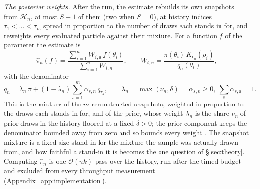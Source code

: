 \documentclass[10pt]{article}
\theoremstyle{plain}
\theoremstyle{definition}
\begin{document}
\emph{The posterior weights.} After the run, the estimate rebuilds its own snapshots from $\mathcal{H}_n$, at most $S{+}1$ of them (two when $S=0$), at history indices $\tau_1<\dots<\tau_m$ spread in proportion to the number of draws each stands in for, and reweights every evaluated particle against their mixture. For a function $f$ of the parameter the estimate is
\begin{equation}
\widehat\pi_n(f) = \frac{\sum_{i=1}^n W_{i,n}\,f(\theta_i)}{\sum_{i=1}^n W_{i,n}},
\qquad
W_{i,n} = \frac{\pi(\theta_i)\,K_{\epsilon_n}(\rho_i)}{\bar q_n(\theta_i)},
\label{eq:posterior-estimator}
\end{equation}
with the denominator
\begin{equation}
\bar q_n = \lambda_n\,\pi + (1-\lambda_n)\sum_{s=1}^{m}\alpha_{s,n}\,q_{\tau_s},
\qquad \lambda_n=\max(\nu_n,\delta),\quad \alpha_{s,n}\ge0,\ \textstyle\sum_s\alpha_{s,n}=1.
\label{eq:snapshot-denominator}
\end{equation}
This is the mixture of the $m$ reconstructed snapshots, weighted in proportion to the draws each stands in for, and of the prior, whose weight $\lambda_n$ is the share $\nu_n$ of prior draws in the history floored at a fixed $\delta>0$; the prior component keeps the denominator bounded away from zero and so bounds every weight \citep{owen2000safe}. The snapshot mixture is a fixed-size stand-in for the mixture the sample was actually drawn from, and how faithful a stand-in it is becomes the one question of \S\ref{sec:theory}. Computing $\widehat\pi_n$ is one $\mathcal{O}(nk)$ pass over the history, run after the timed budget and excluded from every throughput measurement (Appendix~\ref{app:implementation}).
\end{document}
